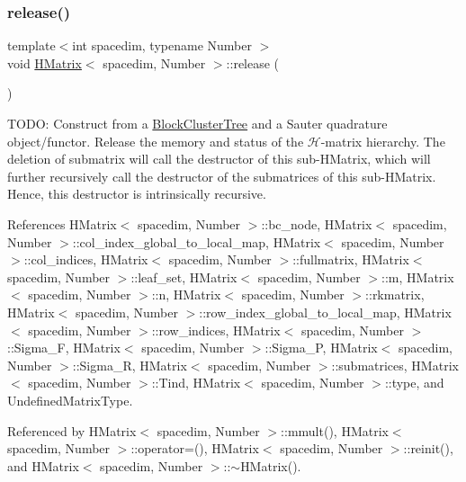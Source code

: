 \subsubsection{\texorpdfstring{release()}{release()}}
{\footnotesize\ttfamily template$<$int spacedim, typename Number $>$ \\
void \hyperlink{classHMatrix}{H\+Matrix}$<$ spacedim, Number $>$\+::release (\begin{DoxyParamCaption}{ }\end{DoxyParamCaption})}

T\+O\+DO\+: Construct from a \hyperlink{classBlockClusterTree}{Block\+Cluster\+Tree} and a Sauter quadrature object/functor. Release the memory and status of the $\mathcal{H}$-\/matrix hierarchy. The deletion of {\ttfamily submatrix} will call the destructor of this sub-\/\+H\+Matrix, which will further recursively call the destructor of the submatrices of this sub-\/\+H\+Matrix. Hence, this destructor is intrinsically recursive.

References H\+Matrix$<$ spacedim, Number $>$\+::bc\+\_\+node, H\+Matrix$<$ spacedim, Number $>$\+::col\+\_\+index\+\_\+global\+\_\+to\+\_\+local\+\_\+map, H\+Matrix$<$ spacedim, Number $>$\+::col\+\_\+indices, H\+Matrix$<$ spacedim, Number $>$\+::fullmatrix, H\+Matrix$<$ spacedim, Number $>$\+::leaf\+\_\+set, H\+Matrix$<$ spacedim, Number $>$\+::m, H\+Matrix$<$ spacedim, Number $>$\+::n, H\+Matrix$<$ spacedim, Number $>$\+::rkmatrix, H\+Matrix$<$ spacedim, Number $>$\+::row\+\_\+index\+\_\+global\+\_\+to\+\_\+local\+\_\+map, H\+Matrix$<$ spacedim, Number $>$\+::row\+\_\+indices, H\+Matrix$<$ spacedim, Number $>$\+::\+Sigma\+\_\+F, H\+Matrix$<$ spacedim, Number $>$\+::\+Sigma\+\_\+P, H\+Matrix$<$ spacedim, Number $>$\+::\+Sigma\+\_\+R, H\+Matrix$<$ spacedim, Number $>$\+::submatrices, H\+Matrix$<$ spacedim, Number $>$\+::\+Tind, H\+Matrix$<$ spacedim, Number $>$\+::type, and Undefined\+Matrix\+Type.



Referenced by H\+Matrix$<$ spacedim, Number $>$\+::mmult(), H\+Matrix$<$ spacedim, Number $>$\+::operator=(), H\+Matrix$<$ spacedim, Number $>$\+::reinit(), and H\+Matrix$<$ spacedim, Number $>$\+::$\sim$\+H\+Matrix().

\mbox{\label{classHMatrix_a9e023f39b1f8916117a63557895a91b4}} 
